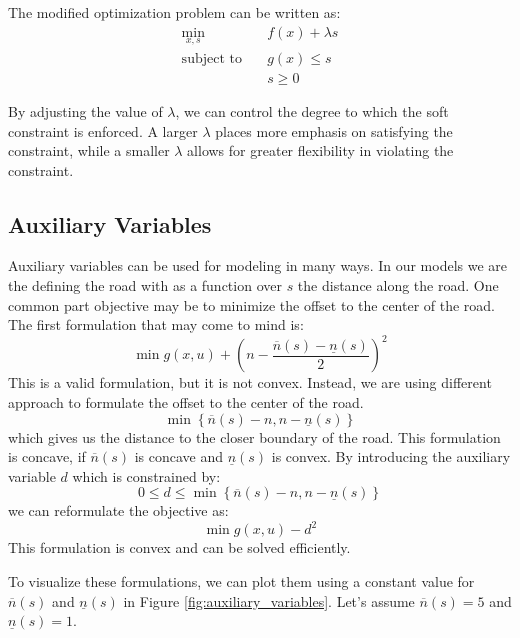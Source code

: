 The modified optimization problem can be written as:
\begin{align*}
	\min_{x, s} \quad       & f(x) + \lambda s \\
	\text{subject to} \quad & g(x) \leq s      \\
	                        & s \geq 0
\end{align*}

By adjusting the value of \( \lambda \), we can control the degree to which the soft constraint is enforced.
A larger \( \lambda \) places more emphasis on satisfying the constraint, while a smaller \( \lambda \) allows for greater flexibility in violating
the constraint.

\subsection{Auxiliary Variables}

Auxiliary variables can be used for modeling in many ways.
In our models we are the defining the road with as a function over $s$ the distance along the road.
One common part objective may be to minimize the offset to the center of the road.
The first formulation that may come to mind is: \[ \min g(x, u) + \left( n - \frac{\overline{n}(s) - \underline{n}(s)}{2} \right)^2 \] This is a
valid formulation, but it is not convex.
Instead, we are using different approach to formulate the offset to the center of the road.
\[
	\min \left\{ \overline{n}(s) - n, n - \underline{n}(s) \right\}
\]
which gives us the distance to the closer boundary of the road.
This formulation is concave, if $\overline{n}(s)$ is concave and $\underline{n}(s)$ is convex.
By introducing the auxiliary variable $d$ which is constrained by: \[ 0 \leq d \leq \min \left\{ \overline{n}(s) - n, n - \underline{n}(s) \right\}
\] we can reformulate the objective as: \[ \min g(x, u) - d^2 \] This formulation is convex and can be solved efficiently.

To visualize these formulations, we can plot them using a constant value for \(\overline{n}(s)\) and \(\underline{n}(s)\) in Figure
\ref{fig:auxiliary_variables}.
Let's assume \(\overline{n}(s) = 5\) and \(\underline{n}(s) = 1\).

